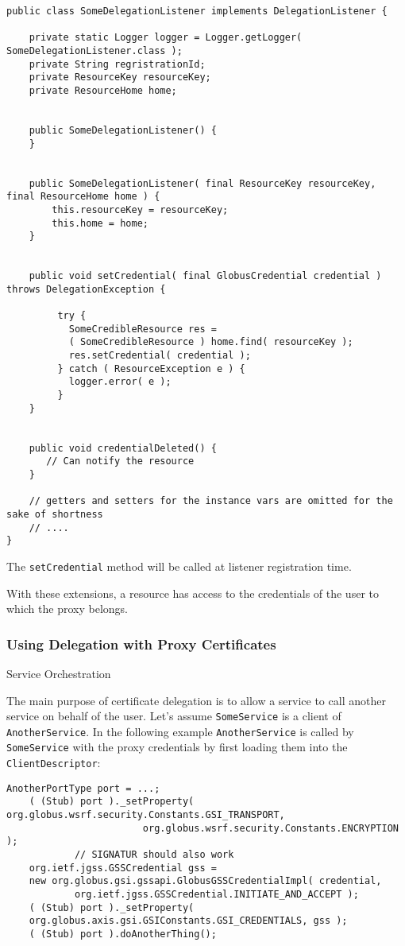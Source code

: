 \documentclass{article}
\begin{document}
\begin{verbatim}
public class SomeDelegationListener implements DelegationListener {

    private static Logger logger = Logger.getLogger( SomeDelegationListener.class );
    private String regristrationId;
    private ResourceKey resourceKey;
    private ResourceHome home;


    public SomeDelegationListener() {
    }


    public SomeDelegationListener( final ResourceKey resourceKey, 
final ResourceHome home ) {
        this.resourceKey = resourceKey;
        this.home = home;
    }


    public void setCredential( final GlobusCredential credential )
throws DelegationException {

         try {
           SomeCredibleResource res = 
           ( SomeCredibleResource ) home.find( resourceKey );
           res.setCredential( credential );
         } catch ( ResourceException e ) {
           logger.error( e );
         }
    }


    public void credentialDeleted() {
       // Can notify the resource
    }

    // getters and setters for the instance vars are omitted for the sake of shortness
    // ....
}
\end{verbatim}

The \verb!setCredential! method will be called at listener
registration time.

With these extensions, a resource has access to the credentials of
the user to which the proxy belongs.

\subsubsection{Using Delegation with Proxy Certificates}

Service Orchestration

The main purpose of certificate delegation is to allow a service to
call another service on behalf of the user. Let's assume
\verb!SomeService! is a client of \verb!AnotherService!. In the
following example \verb!AnotherService! is called by
\verb!SomeService! with the proxy credentials by first loading them
into the \verb!ClientDescriptor!:

\begin{verbatim}
AnotherPortType port = ...;
    ( (Stub) port )._setProperty( org.globus.wsrf.security.Constants.GSI_TRANSPORT,
                        org.globus.wsrf.security.Constants.ENCRYPTION );
            // SIGNATUR should also work
    org.ietf.jgss.GSSCredential gss = 
    new org.globus.gsi.gssapi.GlobusGSSCredentialImpl( credential,
            org.ietf.jgss.GSSCredential.INITIATE_AND_ACCEPT );
    ( (Stub) port )._setProperty( 
    org.globus.axis.gsi.GSIConstants.GSI_CREDENTIALS, gss );
    ( (Stub) port ).doAnotherThing();
\end{verbatim}
\end{document}
